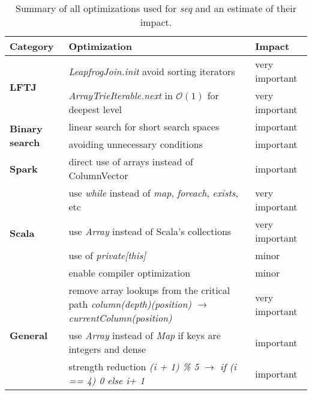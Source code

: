 \begin{table}[]
    \begin{tabular}{@{}lp{12cm}l@{}}
        \toprule
        Category                       & Optimization                                                                           & Impact         \\ \midrule
        \multirow{2}{*}{\textbf{LFTJ}} & \textit{LeapfrogJoin.init} avoid sorting iterators                                               & very important \\
                                       & \textit{ArrayTrieIterable.next} in $\mathcal{O} (1)$ for deepest level                               & very important \\
        \hline
        \multirow{2}{*}{\textbf{Binary search}} & linear search for short search spaces                                                  & important      \\
                                       & avoiding unnecessary conditions                                                        & important      \\
        \hline
        \textbf{Spark}                  & direct use of arrays instead of ColumnVector                                           & important      \\
        \hline
        \multirow{4}{*}{\textbf{Scala}}         & use \textit{while} instead of \textit{map}, \textit{foreach}, \textit{exists}, etc     & very important \\
                                       & use \textit{Array} instead of Scala's collections                                      & very important \\
                                       & use of \textit{private{[}this{]}}                                                      & minor          \\
                                       & enable compiler optimization                                                           & minor          \\
        \hline
        \multirow{3}{*}{\textbf{General}}& remove array lookups from the critical path \textit{column(depth)(position) $\rightarrow$ currentColumn(position)} & very important \\
                                       & use \textit{Array} instead of \textit{Map} if keys are integers and dense              & important      \\

                                       & strength reduction \textit{(i + 1) \% 5} $\rightarrow$ \textit{if (i == 4) 0 else i+ 1}         & important      \\ \bottomrule

    \end{tabular}
\caption{Summary of all optimizations used for \textit{seq} and an estimate of their impact. }
\label{table:optimizations-seq}
\end{table}

